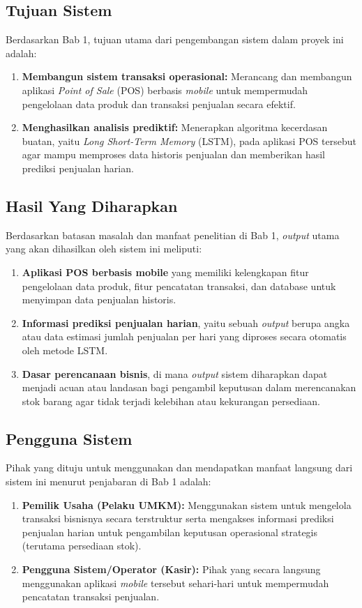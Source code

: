 \documentclass[12pt, a4paper]{article}
\begin{document}
\subsection{Tujuan Sistem}
Berdasarkan Bab 1, tujuan utama dari pengembangan sistem dalam proyek ini adalah:
\begin{enumerate}[label=\arabic*)]
    \item \textbf{Membangun sistem transaksi operasional:} Merancang dan membangun aplikasi \textit{Point of Sale} (POS) berbasis \textit{mobile} untuk mempermudah pengelolaan data produk dan transaksi penjualan secara efektif.
    \item \textbf{Menghasilkan analisis prediktif:} Menerapkan algoritma kecerdasan buatan, yaitu \textit{Long Short-Term Memory} (LSTM), pada aplikasi POS tersebut agar mampu memproses data historis penjualan dan memberikan hasil prediksi penjualan harian.
\end{enumerate}

\subsection{Hasil Yang Diharapkan}
Berdasarkan batasan masalah dan manfaat penelitian di Bab 1, \textit{output} utama yang akan dihasilkan oleh sistem ini meliputi:
\begin{enumerate}[label=\arabic*)]
    \item \textbf{Aplikasi POS berbasis mobile} yang memiliki kelengkapan fitur pengelolaan data produk, fitur pencatatan transaksi, dan database untuk menyimpan data penjualan historis.
    \item \textbf{Informasi prediksi penjualan harian}, yaitu sebuah \textit{output} berupa angka atau data estimasi jumlah penjualan per hari yang diproses secara otomatis oleh metode LSTM.
    \item \textbf{Dasar perencanaan bisnis}, di mana \textit{output} sistem diharapkan dapat menjadi acuan atau landasan bagi pengambil keputusan dalam merencanakan stok barang agar tidak terjadi kelebihan atau kekurangan persediaan.
\end{enumerate}

\subsection{Pengguna Sistem}
Pihak yang dituju untuk menggunakan dan mendapatkan manfaat langsung dari sistem ini menurut penjabaran di Bab 1 adalah:
\begin{enumerate}[label=\arabic*)]
    \item \textbf{Pemilik Usaha (Pelaku UMKM):} Menggunakan sistem untuk mengelola transaksi bisnisnya secara terstruktur serta mengakses informasi prediksi penjualan harian untuk pengambilan keputusan operasional strategis (terutama persediaan stok).
    \item \textbf{Pengguna Sistem/Operator (Kasir):} Pihak yang secara langsung menggunakan aplikasi \textit{mobile} tersebut sehari-hari untuk mempermudah pencatatan transaksi penjualan.
\end{enumerate}
\end{document}
